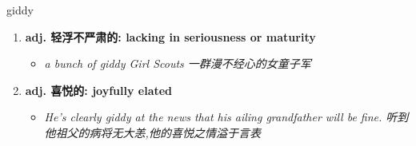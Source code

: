 
\begin{frame}
{\huge giddy}
\begin{center}
\begin{enumerate}\Large
  \item \textbf{adj. 轻浮不严肃的: lacking in seriousness or maturity}
  \begin{itemize}
    \item \em{\Large{a bunch of giddy Girl Scouts 一群漫不经心的女童子军}}
  \end{itemize}
  \item \textbf{adj. 喜悦的: joyfully elated}
  \begin{itemize}
    \item \em{\Large{He's clearly giddy at the news that his ailing grandfather will be fine. 听到他祖父的病将无大恙,他的喜悦之情溢于言表}}
  \end{itemize}
\end{enumerate}
\end{center}
\end{frame}
